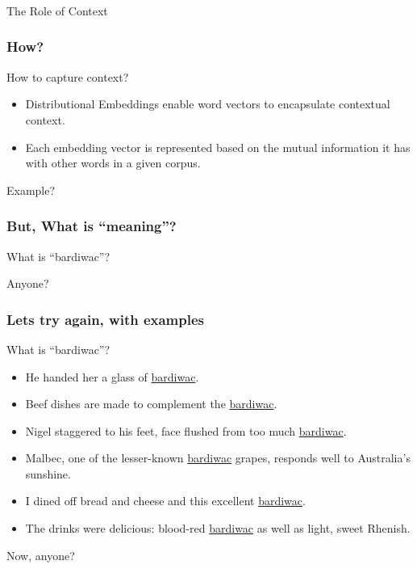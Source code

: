 \begin{frame}[fragile]\frametitle{}

\begin{center}
{\Large The Role of Context}
\end{center}
\end{frame}

\begin{frame}[fragile]\frametitle{How?}

How to capture context? 
\begin{itemize}
\item Distributional Embeddings enable word vectors to encapsulate contextual context. 
\item Each embedding vector is represented based on the mutual information it has with other words in a given corpus. 
\end{itemize}

Example?
\end{frame}




\begin{frame}[fragile]\frametitle{But, What is ``meaning''?}
What is ``bardiwac''?

Anyone?
\end{frame}

\begin{frame}[fragile]\frametitle{Lets try again, with examples}
What is ``bardiwac''?

\begin{itemize}
\item He handed her a glass of \underline{bardiwac}. 
\item Beef dishes are made to complement the \underline{bardiwac}.
\item Nigel staggered to his feet, face flushed from too much
\underline{bardiwac}. 
\item Malbec, one of the lesser-known \underline{bardiwac} grapes,
responds well to Australia’s sunshine. 
\item I dined off bread and cheese and this excellent \underline{bardiwac}. 
\item The drinks were delicious: blood-red \underline{bardiwac} as well as 
light, sweet Rhenish. 
\end{itemize}

Now, anyone?
\end{frame}

